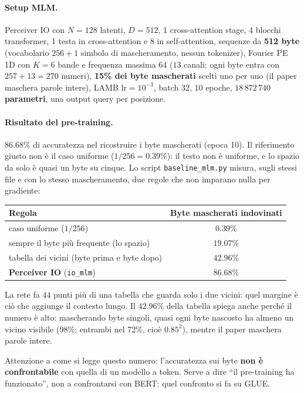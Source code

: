 \documentclass[
  11pt,
]{article}
\begin{document}
\paragraph{Setup MLM.} Perceiver IO con $N=128$ latenti, $D=512$, 1 cross-attention stage, 4 blocchi transformer, 1 testa in cross-attention e 8 in self-attention, sequenze da \textbf{512 byte} (vocabolario $256 + 1$ simbolo di mascheramento, nessun tokenizer), Fourier PE 1D con $K=6$ bande e frequenza massima 64 ($13$ canali: ogni byte entra con $257 + 13 = 270$ numeri), \textbf{15\% dei byte mascherati} scelti uno per uno (il paper maschera parole intere), LAMB $\text{lr}=10^{-3}$, batch 32, 10 epoche, \textbf{$18\,872\,740$ parametri}, una output query per posizione.

\paragraph{Risultato del pre-training.} $\mathbf{86.68\%}$ di accuratezza nel ricostruire i byte mascherati (epoca 10). Il riferimento giusto non è il caso uniforme ($1/256 = 0.39\%$): il testo non è uniforme, e lo spazio da solo è quasi un byte su cinque. Lo script \texttt{baseline\_mlm.py} misura, sugli stessi file e con lo stesso mascheramento, due regole che non imparano nulla per gradiente:

\begin{center}
{\small
\begin{tabular}{@{}lc@{}}
\toprule
\textbf{Regola} & \textbf{Byte mascherati indovinati} \\
\midrule
caso uniforme ($1/256$) & $0.39\%$ \\
sempre il byte più frequente (lo spazio) & $19.07\%$ \\
tabella dei vicini (byte prima e byte dopo) & $42.96\%$ \\
\textbf{Perceiver IO} (\texttt{io\_mlm}) & $\mathbf{86.68\%}$ \\
\bottomrule
\end{tabular}
}
\end{center}

La rete fa $44$ punti più di una tabella che guarda solo i due vicini: quel margine è ciò che aggiunge il contesto lungo. Il $42.96\%$ della tabella spiega anche perché il numero è alto: mascherando byte singoli, quasi ogni byte nascosto ha almeno un vicino visibile (98\%; entrambi nel 72\%, cioè $0.85^2$), mentre il paper maschera parole intere.

Attenzione a come si legge questo numero: l'accuratezza sui byte \textbf{non è confrontabile} con quella di un modello a token. Serve a dire ``il pre-training ha funzionato'', non a confrontarsi con BERT: quel confronto si fa su GLUE.
\end{document}
